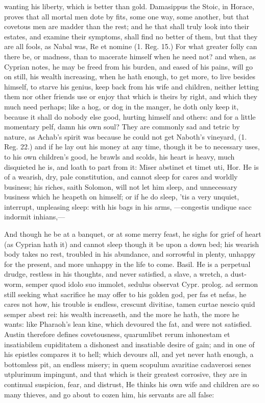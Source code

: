 {wanting his liberty, which is better than gold. Damasippus the Stoic,
in Horace, proves that all mortal men dote by fits, some one way, some
another, but that covetous men are madder than the rest; and he
that shall truly look into their estates, and examine their symptoms,
shall find no better of them, but that they are all fools, as
Nabal was, Re et nomine (1. Reg. 15.) For what greater folly can there
be, or  madness, than to macerate himself when he need not? and
when, as Cyprian notes, he may be freed from his burden, and
eased of his pains, will go on still, his wealth increasing, when he
hath enough, to get more, to live besides himself, to starve his
genius, keep back from his wife and children, neither letting
them nor other friends use or enjoy that which is theirs by right, and
which they much need perhaps; like a hog, or dog in the manger, he doth
only keep it, because it shall do nobody else good, hurting himself and
others: and for a little momentary pelf, damn his own soul? They are
commonly sad and tetric by nature, as Achab's spirit was because he
could not get Naboth's vineyard, (1. Reg. 22.) and if he lay out his
money at any time, though it be to necessary uses, to his own
children's good, he brawls and scolds, his heart is heavy, much
disquieted he is, and loath to part from it: Miser abstinet et timet
uti, Hor. He is of a wearish, dry, pale constitution, and cannot sleep
for cares and worldly business; his riches, saith Solomon, will not let
him sleep, and unnecessary business which he heapeth on himself; or if
he do sleep, 'tis a very unquiet, interrupt, unpleasing sleep: with his
bags in his arms,
---congestis undique sacc
indormit inhians,---

And though he be at a banquet, or at some merry feast, he sighs for
grief of heart (as Cyprian hath it) and cannot sleep though it be
upon a down bed; his wearish body takes no rest, troubled in his
abundance, and sorrowful in plenty, unhappy for the present, and more
unhappy in the life to come. Basil. He is a perpetual drudge,
restless in his thoughts, and never satisfied, a slave, a wretch,
a dust-worm, semper quod idolo suo immolet, sedulus observat Cypr.
prolog. ad sermon still seeking what sacrifice he may offer to his
golden god, per fas et nefas, he cares not how, his trouble is endless,
crescunt divitiae, tamen curtae nescio quid semper abest rei: his
wealth increaseth, and the more he hath, the more he wants: like
Pharaoh's lean kine, which devoured the fat, and were not satisfied.
Austin therefore defines covetousness, quarumlibet rerum
inhonestam et insatiabilem cupiditatem a dishonest and insatiable
desire of gain; and in one of his epistles compares it to hell;
which devours all, and yet never hath enough, a bottomless pit,
an endless misery; in quem scopulum avaritiae cadaverosi senes
utplurimum impingunt, and that which is their greatest corrosive, they
are in continual suspicion, fear, and distrust, He thinks his own wife
and children are so many thieves, and go about to cozen him, his
servants are all false:

}
